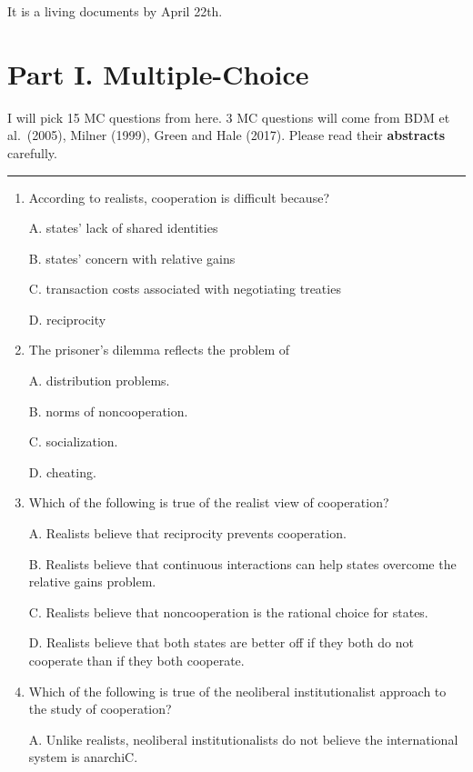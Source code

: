 \documentclass[
]{book}
\begin{document}
It is a living documents by April 22th.

\hypertarget{part-i.-multiple-choice}{%
\section*{Part I. Multiple-Choice}\label{part-i.-multiple-choice}}

I will pick 15 MC questions from here. 3 MC questions will come from BDM et al.~(2005), Milner (1999), Green and Hale (2017). Please read their \textbf{abstracts} carefully.

\begin{center}\rule{0.5\linewidth}{0.5pt}\end{center}

\begin{enumerate}
\def\labelenumi{\arabic{enumi}.}
\item
  According to realists, cooperation is difficult because?

  A. states' lack of shared identities

  B. states' concern with relative gains

  C. transaction costs associated with negotiating treaties

  D. reciprocity
\item
  The prisoner's dilemma reflects the problem of

  A. distribution problems.

  B. norms of noncooperation.

  C. socialization.

  D. cheating.
\item
  Which of the following is true of the realist view of cooperation?

  A. Realists believe that reciprocity prevents cooperation.

  B. Realists believe that continuous interactions can help states overcome the relative gains problem.

  C. Realists believe that noncooperation is the rational choice for states.

  D. Realists believe that both states are better off if they both do not cooperate than if they both cooperate.
\item
  Which of the following is true of the neoliberal institutionalist approach to the study of cooperation?

  A. Unlike realists, neoliberal institutionalists do not believe the international system is anarchiC.


\end{enumerate}
\end{document}
